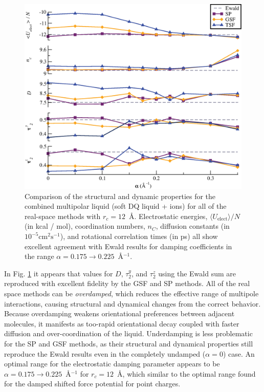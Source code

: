 \begin{figure}
  \includegraphics[width=\textwidth]{properties.eps}
  \caption{Comparison of the structural and dynamic properties for the
    combined multipolar liquid (soft DQ liquid + ions) for all of the
    real-space methods with $r_c = 12$~\AA. Electrostatic energies,
    $\langle U_\mathrm{elect} \rangle / N$ (in kcal / mol),
    coordination numbers, $n_C$, diffusion constants (in $10^{-5}
    \mathrm{cm}^2\mathrm{s}^{-1}$), and rotational correlation times
    (in ps) all show excellent agreement with Ewald results for
    damping coefficients in the range $\alpha= 0.175 \rightarrow
    0.225$~\AA$^{-1}$. \label{fig:Props}}
\end{figure}

In Fig. \ref{fig:Props} it appears that values for $D$, $\tau_2^y$,
and $\tau_2^z$ using the Ewald sum are reproduced with excellent
fidelity by the GSF and SP methods.  All of the real space methods can
be \textit{overdamped}, which reduces the effective range of multipole
interactions, causing structural and dynamical changes from the
correct behavior.  Because overdamping weakens orientational
preferences between adjacent molecules, it manifests as too-rapid
orientational decay coupled with faster diffusion and
over-coordination of the liquid.  Underdamping is less problematic for
the SP and GSF methods, as their structural and dynamical properties
still reproduce the Ewald results even in the completely undamped
($\alpha = 0$) case.  An optimal range for the electrostatic damping
parameter appears to be $\alpha= 0.175 \rightarrow 0.225$~\AA$^{-1}$
for $r_c = 12$~\AA, which similar to the optimal range found for the
damped shifted force potential for point charges.\cite{Gezelter06}


